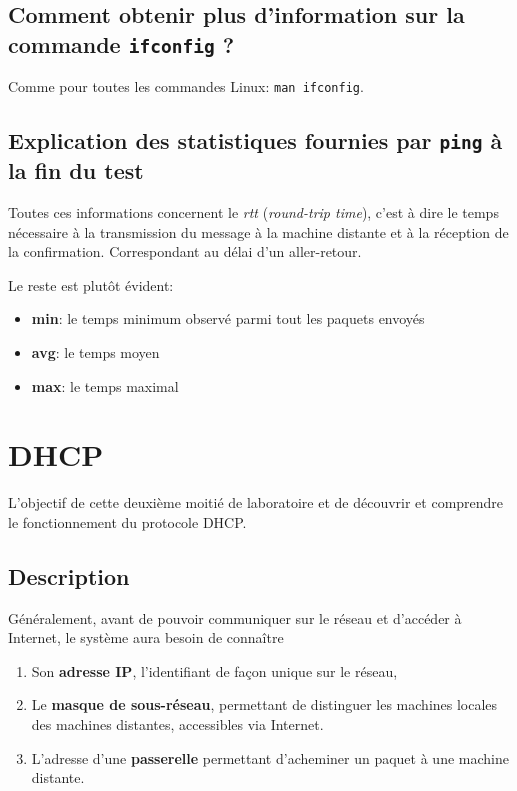 \documentclass[11pt,a4paper]{article}
\begin{document}
\subsection{Comment obtenir plus d'information sur la commande \texttt{ifconfig} ?}

Comme pour toutes les commandes Linux: \texttt{man ifconfig}.

\subsection{Explication des statistiques fournies par \texttt{ping} à la fin du test}

Toutes ces informations concernent le \textit{rtt} (\textit{round-trip time}), c'est à dire le temps nécessaire à la transmission du message à la machine distante et à la réception de la confirmation. Correspondant au délai d'un aller-retour.

Le reste est plutôt évident:

\begin{itemize}
	\item \textbf{min}: le temps minimum observé parmi tout les paquets envoyés
	\item \textbf{avg}: le temps moyen
	\item \textbf{max}: le temps maximal
\end{itemize}

\section{DHCP}

L'objectif de cette deuxième moitié de laboratoire et de découvrir et comprendre le fonctionnement du protocole DHCP.

\subsection{Description}



Généralement, avant de pouvoir communiquer sur le réseau et d'accéder à Internet, le système aura besoin de connaître

\begin{enumerate}
	\item Son \textbf{adresse IP}, l'identifiant de façon unique sur le réseau,
	\item Le \textbf{masque de sous-réseau}, permettant de distinguer les machines locales des machines distantes, accessibles via Internet.
	\item L'adresse d'une \textbf{passerelle} permettant d'acheminer un paquet à une machine distante.
\end{enumerate}
\end{document}
